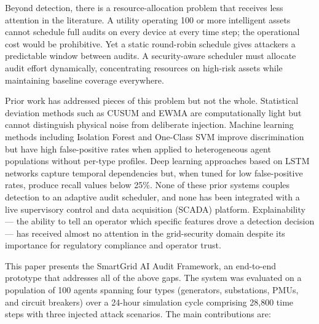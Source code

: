 Beyond detection, there is a resource-allocation problem that receives less attention in the
literature. A utility operating 100 or more intelligent assets cannot schedule full audits on every
device at every time step; the operational cost would be prohibitive. Yet a static round-robin
schedule gives attackers a predictable window between audits. A security-aware scheduler must
allocate audit effort dynamically, concentrating resources on high-risk assets while maintaining
baseline coverage everywhere.

Prior work has addressed pieces of this problem but not the whole. Statistical deviation methods
such as CUSUM and EWMA are computationally light but cannot distinguish physical noise from
deliberate injection. Machine learning methods including Isolation Forest and One-Class SVM improve
discrimination but have high false-positive rates when applied to heterogeneous agent populations
without per-type profiles. Deep learning approaches based on LSTM networks capture temporal
dependencies but, when tuned for low false-positive rates, produce recall values below 25\%. None
of these prior systems couples detection to an adaptive audit scheduler, and none has been
integrated with a live supervisory control and data acquisition (SCADA) platform. Explainability ---
the ability to tell an operator which specific features drove a detection decision --- has received
almost no attention in the grid-security domain despite its importance for regulatory compliance and
operator trust.

This paper presents the SmartGrid AI Audit Framework, an end-to-end prototype that addresses all of
the above gaps. The system was evaluated on a population of 100 agents spanning four types
(generators, substations, PMUs, and circuit breakers) over a 24-hour simulation cycle comprising
28,800 time steps with three injected attack scenarios. The main contributions are:

